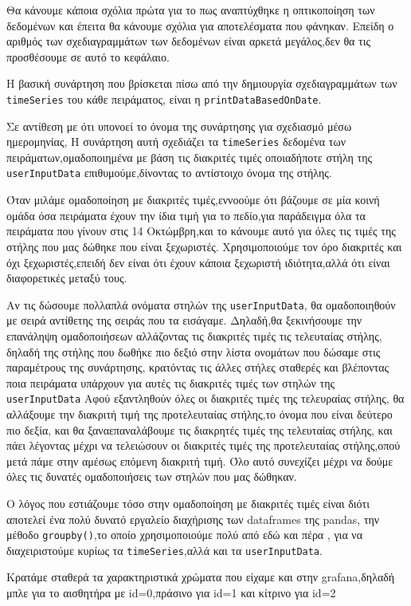 Θα κάνουμε κάποια σχόλια πρώτα για το πως αναπτύχθηκε η οπτικοποίηση των δεδομένων και έπειτα
θα κάνουμε σχόλια για αποτελέσματα που φάνηκαν.
Επείδη ο αριθμός των σχεδιαγραμμάτων των δεδομένων είναι αρκετά μεγάλος,δεν θα τις προσθέσουμε σε αυτό το κεφάλαιο.

Η βασική συνάρτηση που βρίσκεται πίσω από την δημιουργία σχεδιαγραμμάτων των 
\texttt{timeSeries} του κάθε πειράματος,
είναι η \texttt{printDataBasedOnDate}.

Σε αντίθεση με ότι υπονοεί το όνομα της συνάρτησης για σχεδιασμό μέσω ημερομηνίας,
Η συνάρτηση αυτή σχεδιάζει τα \texttt{timeSeries} δεδομένα των πειράματων,ομαδοποιημένα με βάση
τις διακριτές τιμές οποιαδήποτε στήλη της \texttt{userInputData} επιθυμούμε,δίνοντας το αντίστοιχο όνομα της στήλης.

Όταν μιλάμε ομαδοποίηση με διακριτές τιμές,εννοούμε ότι βάζουμε σε μία κοινή ομάδα όσα 
πειράματα έχουν την ίδια τιμή για το πεδίο,για παράδειγμα όλα τα πειράματα που γίνουν στις
14 Οκτώμβρη,και το κάνουμε αυτό για όλες τις τιμές της στήλης που μας δώθηκε που είναι ξεχωριστές.
Χρησιμοποιούμε τον όρο διακριτές και όχι ξεχωριστές,επειδή δεν είναι ότι έχουν κάποια ξεχωριστή 
ιδιότητα,αλλά ότι είναι διαφορετικές μεταξύ τους.

Αν τις δώσουμε πολλαπλά ονόματα στηλών της \texttt{userInputData},
θα ομαδοποιηθούν με σειρά αντίθετης της σειράς που τα εισάγαμε.
Δηλαδή,θα ξεκινήσουμε την επανάληψη ομαδοποιήσεων αλλάζοντας τις διακριτές τιμές τις τελευταίας στήλης,
δηλαδή της στήλης που δωθήκε πιο δεξιό στην λίστα ονομάτων που δώσαμε στις παραμέτρους της συνάρτησης,
κρατόντας τις άλλες στήλες σταθερές και βλέποντας ποια πειράματα υπάρχουν για αυτές τις διακριτές τιμές
των στηλών της \texttt{userInputData}
Αφού εξαντληθούν όλες οι διακριτές τιμές της τελευραίας στήλης,
θα αλλάξουμε την διακριτή τιμή της προτελευταίας στήλης,το όνομα που είναι δεύτερο πιο δεξία, και θα ξαναεπαναλάβουμε τις διακρητές τιμές της τελευταίας στήλης,
και πάει λέγοντας μέχρι να τελειώσουν οι διακριτές τιμές της προτελευταίας στήλης,οπού μετά πάμε στην αμέσως επόμενη διακριτή τιμή.
Όλο αυτό συνεχίζει μέχρι να δούμε όλες τις δυνατές ομαδοποιήσεις των στηλών που μας δώθηκαν.

Ο λόγος που εστιάζουμε τόσο στην ομαδοποίηση με διακριτές τιμές είναι διότι αποτελεί ένα πολύ
δυνατό εργαλείο διαχήρισης των dataframes της pandas, 
την μέθοδο \texttt{groupby()},το οποίο χρησιμοποιούμε πολύ από εδώ και πέρα ,
για να διαχειριστούμε  κυρίως τα \texttt{timeSeries},αλλά και τα \texttt{userInputData}.

Κρατάμε σταθερά τα χαρακτηριστικά χρώματα που είχαμε και στην grafana,δηλαδή μπλε για το αισθητήρα
με id=0,πράσινο για id=1 και κίτρινο για id=2